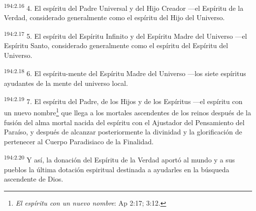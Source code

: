 \par 
\textsuperscript{194:2.16} 4. El espíritu del Padre Universal y del Hijo Creador ---el Espíritu de la Verdad, considerado generalmente como el espíritu del Hijo del Universo.

\par 
\textsuperscript{194:2.17} 5. El espíritu del Espíritu Infinito y del Espíritu Madre del Universo ---el Espíritu Santo, considerado generalmente como el espíritu del Espíritu del Universo.

\par 
\textsuperscript{194:2.18} 6. El espíritu-mente del Espíritu Madre del Universo ---los siete espíritus ayudantes de la mente del universo local.

\par 
\textsuperscript{194:2.19} 7. El espíritu del Padre, de los Hijos y de los Espíritus ---el espíritu con un nuevo nombre\footnote{\textit{El espíritu con un nuevo nombre}: Ap 2:17; 3:12.} que llega a los mortales ascendentes de los reinos después de la fusión del alma mortal nacida del espíritu con el Ajustador del Pensamiento del Paraíso, y después de alcanzar posteriormente la divinidad y la glorificación de pertenecer al Cuerpo Paradisiaco de la Finalidad.

\par 
\textsuperscript{194:2.20} Y así, la donación del Espíritu de la Verdad aportó al mundo y a sus pueblos la última dotación espiritual destinada a ayudarles en la búsqueda ascendente de Dios.

